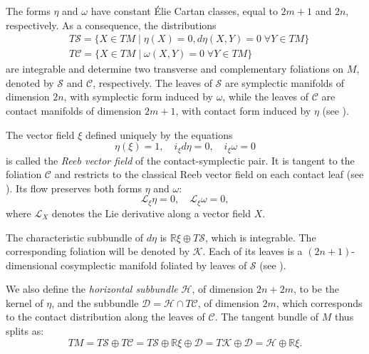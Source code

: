 \documentclass[12pt]{amsart}
\theoremstyle{definition}
\theoremstyle{remark}
\begin{document}
\medskip 
\noindent
The forms $\eta$ and  $\omega$ have constant \'Elie Cartan classes, 
equal to $2m+1$ and $2n$, respectively.
As a consequence, the distributions
\begin{align*}
&T\mathcal{S}=\{X\in TM \mid \eta(X)=0, d\eta(X,Y)=0 \;  \forall Y \in TM  \} \\
&T\mathcal{C}=\{X \in TM  \mid \omega(X,Y)=0 \;  \forall Y \in TM  \}
\end{align*}
are integrable and determine two transverse and complementary foliations on $M$, denoted by $\mathcal{S}$ and $\mathcal{C}$, respectively.
The leaves of $\mathcal{S}$ are symplectic manifolds of dimension $2n$, with symplectic form induced by $\omega$, while the leaves of $\mathcal{C}$ are contact manifolds of dimension $2m+1$, with contact form induced by $\eta$ (see \cite{B}).


\medskip 
\noindent
The vector field $\xi$ defined uniquely by the equations
\begin{equation*}
\eta(\xi) = 1, \quad
i_\xi d\eta = 0, \quad
i_\xi \omega = 0
\end{equation*}
is called the \emph{Reeb vector field} of the contact-symplectic pair.
It is tangent to the foliation $\mathcal{C}$ and restricts to the classical Reeb vector field on each contact leaf (see \cite{B}).
Its flow preserves both forms $\eta$ and $\omega$:
\begin{equation*}
\mathcal{L}_\xi \eta = 0, \quad \mathcal{L}_\xi \omega = 0,
\end{equation*}
where $\mathcal{L}_X$ denotes the Lie derivative along a vector field $X$.

\medskip 
\noindent
The characteristic subbundle of  $d\eta$ is $\mathbb{R}\xi \oplus T\mathcal{S}$, which is integrable. The corresponding foliation will be denoted by $\mathcal{K}$.
Each of its leaves is a $(2n+1)$-dimensional cosymplectic manifold foliated by leaves of $\mathcal{S}$ (see \cite{B}).

\medskip 
\noindent
We also define the  \emph{horizontal subbundle} $ \mathcal{H}$, of dimension $2n+2m$, to be the kernel of $\eta$, 
and the  subbundle $\mathcal{D}=\mathcal{H}\cap T\mathcal{C}$, of dimension $2m$, which corresponds to the contact distribution along the leaves of $\mathcal{C}$.
The tangent bundle of $M$ thus splits as:
\begin{equation*}
TM=T\mathcal{S}\oplus T\mathcal{C} = T\mathcal{S}\oplus \mathbb{R}\xi  \oplus \mathcal{D} = T\mathcal{K} \oplus  \mathcal{D}=  \mathcal{H}\oplus \mathbb{R}\xi .
\end{equation*}
\end{document}
